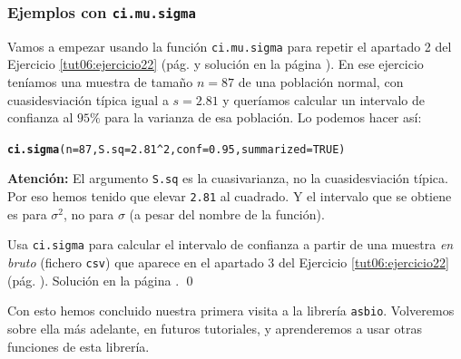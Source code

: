 \documentclass[10pt,a4paper]{article}\usepackage[]{graphicx}\usepackage[]{color}
\makeatletter
\newcommand{\hlnum}[1]{\textcolor[rgb]{0.686,0.059,0.569}{#1}}%
\newcommand{\hlopt}[1]{\textcolor[rgb]{0,0,0}{#1}}%
\newcommand{\hlstd}[1]{\textcolor[rgb]{0.345,0.345,0.345}{#1}}%
\newcommand{\hlkwc}[1]{\textcolor[rgb]{0.333,0.667,0.333}{#1}}%
\newcommand{\hlkwd}[1]{\textcolor[rgb]{0.737,0.353,0.396}{\textbf{#1}}}%
\newenvironment{kframe}{%
 \def\at@end@of@kframe{}%
 \ifinner\ifhmode%
  \def\at@end@of@kframe{\end{minipage}}%
  \begin{minipage}{\columnwidth}%
 \fi\fi%
 \def\FrameCommand##1{\hskip\@totalleftmargin \hskip-\fboxsep
 \colorbox{shadecolor}{##1}\hskip-\fboxsep
     \hskip-\linewidth \hskip-\@totalleftmargin \hskip\columnwidth}%
 \MakeFramed {\advance\hsize-\width
   \@totalleftmargin\z@ \linewidth\hsize
   \@setminipage}}%
 {\par\unskip\endMakeFramed%
 \at@end@of@kframe}
\newenvironment{knitrout}{}{} %
\newcounter {cont01}
\makeatother
\begin{document}
\subsubsection*{Ejemplos con {\tt ci.mu.sigma}}

Vamos a empezar usando la función {\tt ci.mu.sigma} para repetir el apartado 2 del Ejercicio \ref{tut06:ejercicio22} (pág. \pageref{tut06:ejercicio22} y solución en la página \pageref{tut06:ejercicio22:sol}). En ese ejercicio teníamos una muestra de tamaño $n=87$ de una población normal, con cuasidesviación típica igual a $s=2.81$ y queríamos calcular un intervalo de confianza al $95\%$ para la varianza de esa población. Lo podemos hacer así:
\begin{knitrout}
\color{fgcolor}\begin{kframe}
\begin{alltt}
\hlkwd{ci.sigma}\hlstd{(}\hlkwc{n}\hlstd{=}\hlnum{87}\hlstd{,} \hlkwc{S.sq} \hlstd{=} \hlnum{2.81}\hlopt{^}\hlnum{2}\hlstd{,} \hlkwc{conf}\hlstd{=}\hlnum{0.95}\hlstd{,} \hlkwc{summarized}\hlstd{=}\hlnum{TRUE}\hlstd{)}
\end{alltt}


{\ttfamily\noindent\bfseries{}}\end{kframe}
\end{knitrout}
{\bf Atención:} El argumento {\tt S.sq} es la cuasivarianza, no la cuasidesviación típica. Por eso hemos tenido que elevar {\tt 2.81} al cuadrado. Y el intervalo que se obtiene es para $\sigma^2$, no para $\sigma$ (a pesar del nombre de la función).

\begin{ejercicio}
\label{tut06:ejercicio25}
Usa {\tt ci.sigma} para calcular el intervalo de confianza a partir de una muestra {\em en bruto} (fichero {\tt csv}) que aparece en el apartado 3 del Ejercicio \ref{tut06:ejercicio22} (pág. \pageref{tut06:ejercicio22}). Solución en la página \pageref{tut06:ejercicio25:sol}.
\qed
\end{ejercicio}

Con esto hemos concluido nuestra primera visita a la librería {\tt asbio}. Volveremos sobre ella más adelante, en futuros tutoriales, y aprenderemos a usar otras funciones de esta librería.


%
%
%
\end{document}
